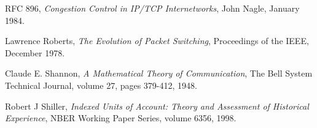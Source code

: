 \begin{thebibliography}{9}
    RFC 896,
    \emph{Congestion Control in IP/TCP Internetworks},
    John Nagle,
    January 1984.


    Lawrence Roberts,
    \emph{The Evolution of Packet Switching},
    Proceedings of the IEEE,
    December 1978.


    Claude E. Shannon,
    \emph{A Mathematical Theory of Communication},
    The Bell System Technical Journal,
    volume 27,
    pages 379-412,
    1948.

    Robert J Shiller,
    \emph{Indexed Units of Account: Theory and Assessment of Historical Experience},
    NBER Working Paper Series,
    volume 6356,
    1998.





% 
% 
% 
% 
% 
% 


\end{thebibliography}

